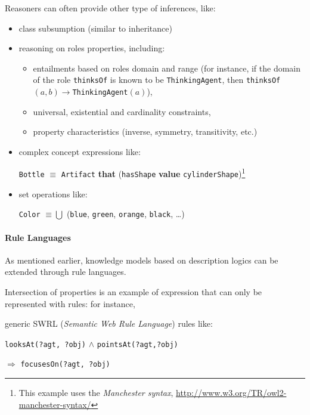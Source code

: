 \documentclass[a4paper, twocolumn]{article}
\newcommand{\concept}[1]{{\footnotesize \texttt{#1}}}
\begin{document}
Reasoners can often provide other type of inferences, like:

\begin{itemize}
    \item class subsumption (similar to inheritance)

    \item reasoning on roles properties, including:
        \begin{itemize}
        \item entailments based on roles domain and range (for instance, if the
        domain of the role \concept{thinksOf} is known to be
        \concept{ThinkingAgent}, then \concept{thinksOf}$(a, b) \to
        $\concept{ThinkingAgent}$(a)$),

        \item universal, existential and cardinality constraints,

        \item property characteristics (inverse, symmetry, transitivity, etc.)

        \end{itemize}

    \item complex concept expressions like: \par \footnotesize \concept{Bottle}
    $\equiv$ \concept{Artifact} {\bf that} (\concept{hasShape} {\bf value}
    \concept{cylinderShape})\footnote{This example uses the \emph{Manchester
    syntax}, \url{http://www.w3.org/TR/owl2-manchester-syntax/}} \normalsize

    \item set operations like: \par \footnotesize \concept{Color} $\equiv \bigcup$ (\concept{blue}, \concept{green}, \concept{orange},
    \concept{black}, \ldots) \normalsize

\end{itemize}

\paragraph{Rule Languages}

As mentioned earlier, knowledge models based on description logics can be extended through rule languages.

Intersection of properties is an example of expression that can only be represented with rules: for instance, 

generic SWRL ({\em Semantic Web Rule Language}) rules like: \par
        \footnotesize \concept{looksAt(?agt, ?obj)} $\land$
        \concept{pointsAt(?agt,?obj)} \par $\Rightarrow$ \concept{focusesOn(?agt, ?obj)}
        \normalsize 
\end{document}
